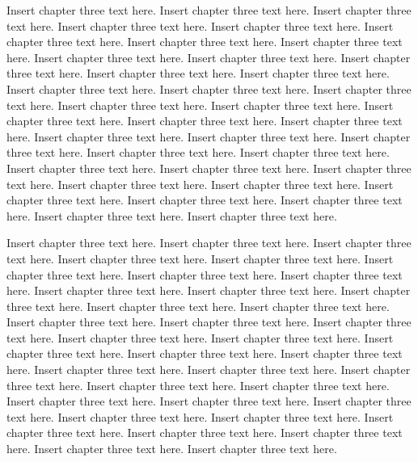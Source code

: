 Insert chapter three text here. Insert chapter three text here. Insert chapter three text here. Insert chapter three text here. Insert chapter three text here. Insert chapter three text here. Insert chapter three text here. Insert chapter three text here. Insert chapter three text here. Insert chapter three text here. Insert chapter three text here. Insert chapter three text here. Insert chapter three text here. Insert chapter three text here. Insert chapter three text here. Insert chapter three text here. Insert chapter three text here. Insert chapter three text here. Insert chapter three text here. Insert chapter three text here. Insert chapter three text here. Insert chapter three text here. Insert chapter three text here. Insert chapter three text here. Insert chapter three text here. Insert chapter three text here. Insert chapter three text here. Insert chapter three text here. Insert chapter three text here. Insert chapter three text here. Insert chapter three text here. Insert chapter three text here. Insert chapter three text here. Insert chapter three text here. Insert chapter three text here. Insert chapter three text here.

Insert chapter three text here. Insert chapter three text here. Insert chapter three text here. Insert chapter three text here. Insert chapter three text here. Insert chapter three text here. Insert chapter three text here. Insert chapter three text here. Insert chapter three text here. Insert chapter three text here. Insert chapter three text here. Insert chapter three text here. Insert chapter three text here. Insert chapter three text here. Insert chapter three text here. Insert chapter three text here. Insert chapter three text here. Insert chapter three text here. Insert chapter three text here. Insert chapter three text here. Insert chapter three text here. Insert chapter three text here. Insert chapter three text here. Insert chapter three text here. Insert chapter three text here. Insert chapter three text here. Insert chapter three text here. Insert chapter three text here. Insert chapter three text here. Insert chapter three text here. Insert chapter three text here. Insert chapter three text here. Insert chapter three text here. Insert chapter three text here. Insert chapter three text here. Insert chapter three text here.

